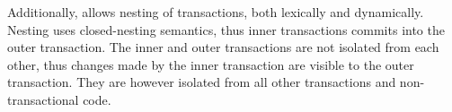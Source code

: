 Additionally, \stmnamesp allows nesting of transactions, both lexically and dynamically. Nesting uses closed-nesting semantics, thus inner transactions commits into the outer transaction. The inner and outer transactions are not isolated from each other, thus changes made by the inner transaction are visible to the outer transaction. They are however isolated from all other transactions and non-transactional code.


%
%
%
%   
%
%   
       
       

\worksheetend